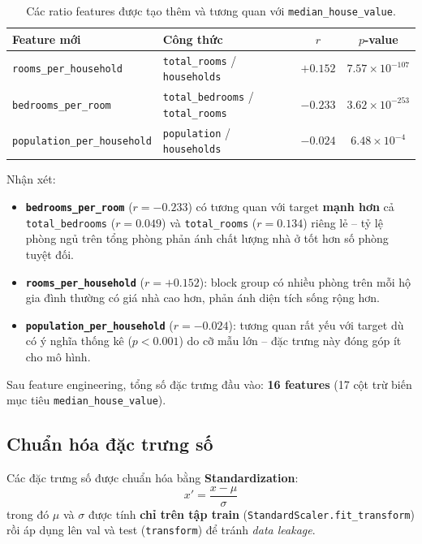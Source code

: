 \documentclass[12pt,a4paper]{article}
\begin{document}
\begin{table}[H]
  \centering
  \caption{Các ratio features được tạo thêm và tương quan với
           \texttt{median\_house\_value}.}
  \label{tab:ratio_features}
  \begin{tabular}{llcc}
    \toprule
    \textbf{Feature mới} & \textbf{Công thức} & $r$ & $p$-value \\
    \midrule
    \texttt{rooms\_per\_household}
      & \texttt{total\_rooms} / \texttt{households}
      & $+0.152$ & $7.57 \times 10^{-107}$ \\
    \texttt{bedrooms\_per\_room}
      & \texttt{total\_bedrooms} / \texttt{total\_rooms}
      & $-0.233$ & $3.62 \times 10^{-253}$ \\
    \texttt{population\_per\_household}
      & \texttt{population} / \texttt{households}
      & $-0.024$ & $6.48 \times 10^{-4}$ \\
    \bottomrule
  \end{tabular}
\end{table}

Nhận xét:
\begin{itemize}
  \item \textbf{\texttt{bedrooms\_per\_room}} ($r = -0.233$) có tương
        quan với target \textbf{mạnh hơn} cả \texttt{total\_bedrooms}
        ($r = 0.049$) và \texttt{total\_rooms} ($r = 0.134$) riêng lẻ --
        tỷ lệ phòng ngủ trên tổng phòng phản ánh chất lượng nhà ở tốt hơn
        số phòng tuyệt đối.
  \item \textbf{\texttt{rooms\_per\_household}} ($r = +0.152$): block
        group có nhiều phòng trên mỗi hộ gia đình thường có giá nhà cao hơn,
        phản ánh diện tích sống rộng hơn.
  \item \textbf{\texttt{population\_per\_household}} ($r = -0.024$):
        tương quan rất yếu với target dù có ý nghĩa thống kê ($p < 0.001$)
        do cỡ mẫu lớn -- đặc trưng này đóng góp ít cho mô hình.
\end{itemize}

Sau feature engineering, tổng số đặc trưng đầu vào:
\textbf{16 features} (17 cột trừ biến mục tiêu
\texttt{median\_house\_value}).

\subsection{Chuẩn hóa đặc trưng số}

Các đặc trưng số được chuẩn hóa bằng \textbf{Standardization}:
$$x' = \frac{x - \mu}{\sigma}$$
trong đó $\mu$ và $\sigma$ được tính \textbf{chỉ trên tập train}
(\texttt{StandardScaler.fit\_transform}) rồi áp dụng lên val và test
(\texttt{transform}) để tránh \emph{data leakage}.
\end{document}
